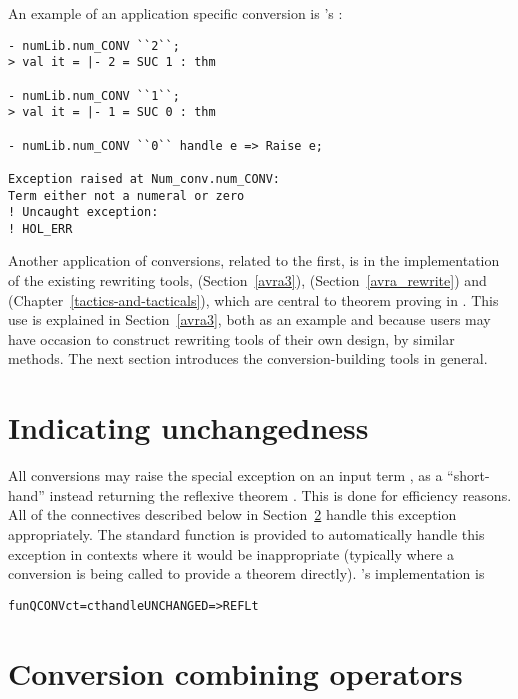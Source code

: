 \noindent An example of an application specific conversion is
's :

\setcounter{sessioncount}{1}
\begin{session}
\begin{verbatim}
- numLib.num_CONV ``2``;
> val it = |- 2 = SUC 1 : thm

- numLib.num_CONV ``1``;
> val it = |- 1 = SUC 0 : thm

- numLib.num_CONV ``0`` handle e => Raise e;

Exception raised at Num_conv.num_CONV:
Term either not a numeral or zero
! Uncaught exception:
! HOL_ERR
\end{verbatim}
\end{session}

Another application of conversions, related to the first, is in the
implementation of the existing rewriting tools, 
(Section~\ref{avra3}),  (Section~\ref{avra_rewrite})
and  (Chapter~\ref{tactics-and-tacticals}), which are
central to theorem proving in \HOL.  This use is explained in
Section~\ref{avra3}, both as an example and because users may have
occasion to construct rewriting tools of their own design, by similar
methods.  The next section introduces the conversion-building tools in
general.

\section{Indicating unchangedness}

All conversions may raise the special exception  on
an input term , as a ``short-hand'' instead returning the
reflexive theorem .  This is done for efficiency reasons.
All of the connectives described below in Section~\ref{avra1} handle
this exception appropriately.  The standard function  is
provided to automatically handle this exception in contexts where it
would be inappropriate (typically where a conversion is being called
to provide a theorem directly).  's implementation is
\begin{alltt}
   fun QCONV c t = c t handle UNCHANGED => REFL t
\end{alltt}


\section{Conversion combining operators}
\label{avra1}


